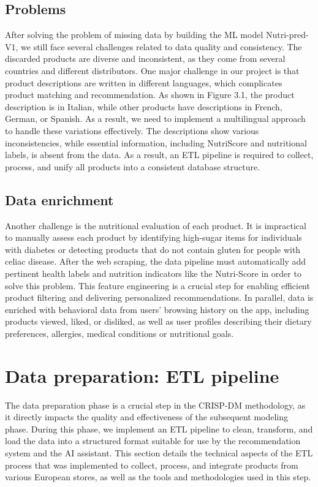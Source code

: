 \subsection{Problems} 
After solving the problem of missing data by building the ML model Nutri-pred-V1, we still face several challenges related to data quality and consistency.
The discarded products are diverse and inconsistent, as they come from
several countries and different distributors.
One major challenge in our project is that product descriptions are
written in different languages, which complicates product matching and
recommendation. As shown in Figure 3.1, the product description is in
Italian, while other products have descriptions in French, German, or
Spanish. As a result, we need to implement a multilingual approach
to handle these variations effectively. The descriptions show various
inconsistencies, while essential information, including NutriScore and
nutritional labels, is absent from the data.
As a result, an ETL pipeline is required to collect, process, and unify all
products into a consistent database structure.


\subsection{Data enrichment}
Another challenge is the nutritional evaluation of each product. It is
impractical to manually assess each product by identifying high-sugar
items for individuals with diabetes or detecting products that do not
contain gluten for people with celiac disease. After the web scraping, the
data pipeline must automatically add pertinent health labels and nutrition
indicators like the Nutri-Score in order to solve this problem. This feature
engineering is a crucial step for enabling efficient product filtering and
delivering personalized recommendations. In parallel, data is enriched
with behavioral data from users’ browsing history on the app, including
products viewed, liked, or disliked, as well as user profiles describing their
dietary preferences, allergies, medical conditions or nutritional goals.

\section{Data preparation: ETL pipeline}


The data preparation phase is a crucial step in the CRISP-DM methodology, as it directly impacts the quality and effectiveness of the subsequent
modeling phase. During this phase, we implement an ETL pipeline to
clean, transform, and load the data into a structured format suitable for
use by the recommendation system and the AI assistant. This section
details the technical aspects of the ETL process that was implemented
to collect, process, and integrate products from various European stores,
as well as the tools and methodologies used in this step.

